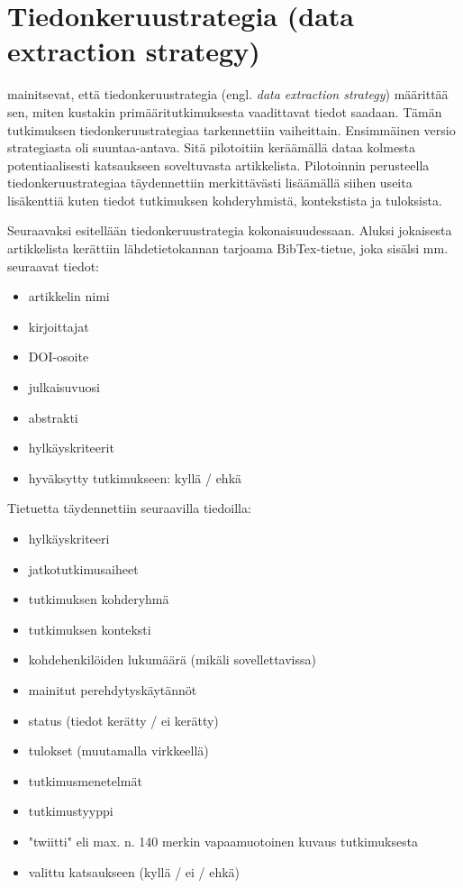 \documentclass[utf8]{gradu3}
\begin{document}
\section{Tiedonkeruustrategia (data extraction strategy)}
\label{luku-tiedonkeruustrategia}

\textcite{kitchenham-charters-2007} mainitsevat, että tiedonkeruustrategia (engl. \textit{data extraction strategy}) määrittää sen, miten kustakin primääritutkimuksesta vaadittavat tiedot saadaan. Tämän tutkimuksen tiedonkeruustrategiaa tarkennettiin vaiheittain. Ensimmäinen versio strategiasta oli suuntaa-antava. Sitä pilotoitiin keräämällä dataa kolmesta potentiaalisesti katsaukseen soveltuvasta artikkelista. Pilotoinnin perusteella tiedonkeruustrategiaa täydennettiin merkittävästi lisäämällä siihen useita lisäkenttiä kuten tiedot tutkimuksen kohderyhmistä, kontekstista ja tuloksista.

Seuraavaksi esitellään tiedonkeruustrategia kokonaisuudessaan. Aluksi jokaisesta artikkelista kerättiin lähdetietokannan tarjoama BibTex-tietue, joka sisälsi mm. seuraavat tiedot:

\begin{itemize}
    \item artikkelin nimi
    \item kirjoittajat
    \item DOI-osoite
    \item julkaisuvuosi
    \item abstrakti
    \item hylkäyskriteerit
    \item hyväksytty tutkimukseen: kyllä / ehkä
\end{itemize}

Tietuetta täydennettiin seuraavilla tiedoilla:

\begin{itemize}
    \item hylkäyskriteeri
    \item jatkotutkimusaiheet
    \item tutkimuksen kohderyhmä
    \item tutkimuksen konteksti
    \item kohdehenkilöiden lukumäärä (mikäli sovellettavissa)
    \item mainitut perehdytyskäytännöt
    \item status (tiedot kerätty / ei kerätty)
    \item tulokset (muutamalla virkkeellä)
    \item tutkimusmenetelmät
    \item tutkimustyyppi
    \item "twiitti" eli max. n. 140 merkin vapaamuotoinen kuvaus tutkimuksesta
    \item valittu katsaukseen (kyllä / ei / ehkä)
\end{itemize}
\end{document}
